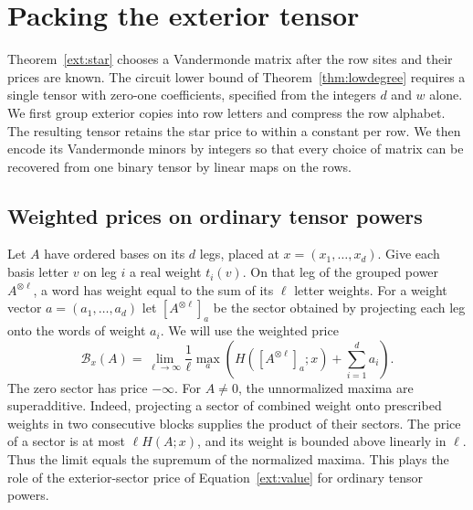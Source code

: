 \section{Packing the exterior tensor}\label{sec:packing}

Theorem~\ref{ext:star} chooses a Vandermonde matrix after the row sites
and their prices are known. The circuit lower bound of
Theorem~\ref{thm:lowdegree} requires a single tensor with zero-one
coefficients, specified from the integers $d$ and $w$ alone. We first
group exterior copies into row letters and compress the row alphabet.
The resulting tensor retains the star price to within a constant per
row. We then encode its Vandermonde minors by integers so that every
choice of matrix can be recovered from one binary tensor by linear maps
on the rows.

\subsection{Weighted prices on ordinary tensor powers}
Let $A$ have ordered bases on its $d$ legs, placed at
$x=(x_1,\ldots,x_d)$. Give each basis letter $v$ on leg $i$ a real
weight $t_i(v)$. On that leg of the grouped power $A^{\otimes\ell}$,
a word has weight equal to the sum of its $\ell$ letter weights.
For a weight vector $a=(a_1,\ldots,a_d)$ let $[A^{\otimes\ell}]_a$
be the sector obtained by projecting each leg onto the words of
weight $a_i$. We will use the weighted price
\begin{equation}\label{pack:weighted}
 \mathcal B_x(A)=\lim_{\ell\to\infty}\frac{1}{\ell}
 \max_a\left( H([A^{\otimes\ell}]_a;x)+\sum_{i=1}^d a_i\right).
\end{equation}
The zero sector has price $-\infty$. For $A\ne0$, the unnormalized
maxima are superadditive. Indeed, projecting a sector of combined
weight onto prescribed weights in two consecutive blocks supplies the
product of their sectors. The price of a sector is at most
$\ell H(A;x)$, and its weight is bounded above linearly in $\ell$.
Thus the limit equals the supremum of the normalized maxima. This
plays the role of
the exterior-sector price of Equation~\eqref{ext:value} for ordinary
tensor powers.

